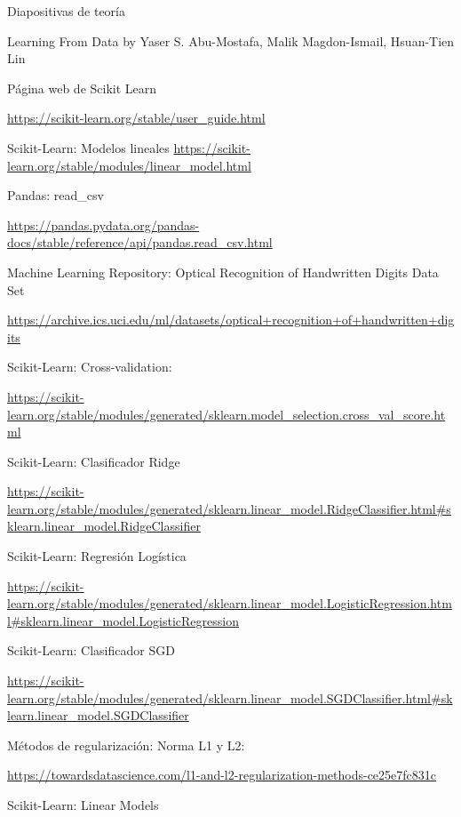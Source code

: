 \documentclass[12pt, spanish]{article}
\begin{document}
\begin{thebibliography}{9}


Diapositivas de teoría

Learning From Data by Yaser S. Abu-Mostafa, Malik Magdon-Ismail, Hsuan-Tien Lin

Página web de Scikit Learn

\url{https://scikit-learn.org/stable/user_guide.html}


Scikit-Learn: Modelos lineales
\url{https://scikit-learn.org/stable/modules/linear_model.html}


Pandas: read\_csv

\url{https://pandas.pydata.org/pandas-docs/stable/reference/api/pandas.read_csv.html}

Machine Learning Repository: Optical Recognition of Handwritten Digits Data Set 

\url{https://archive.ics.uci.edu/ml/datasets/optical+recognition+of+handwritten+digits}


Scikit-Learn: Cross-validation:

\url{https://scikit-learn.org/stable/modules/generated/sklearn.model_selection.cross_val_score.html}



Scikit-Learn: Clasificador Ridge

\url{https://scikit-learn.org/stable/modules/generated/sklearn.linear_model.RidgeClassifier.html#sklearn.linear_model.RidgeClassifier}

Scikit-Learn: Regresión Logística

\url{https://scikit-learn.org/stable/modules/generated/sklearn.linear_model.LogisticRegression.html#sklearn.linear_model.LogisticRegression}

Scikit-Learn: Clasificador SGD 

\url{https://scikit-learn.org/stable/modules/generated/sklearn.linear_model.SGDClassifier.html#sklearn.linear_model.SGDClassifier}


Métodos de regularización: Norma L1 y L2:

\url{https://towardsdatascience.com/l1-and-l2-regularization-methods-ce25e7fc831c}


Scikit-Learn: Linear Models


\end{thebibliography}
\end{document}
